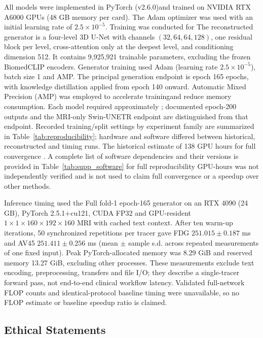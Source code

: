 \documentclass{article}
\providecommand{\DIFaddtex}[1]{{\protect\color{blue} \sf #1}} %
\providecommand{\DIFdeltex}[1]{{\protect\color{red} \scriptsize #1}} %
\providecommand{\DIFaddbegin}{} %
\providecommand{\DIFaddend}{} %
\providecommand{\DIFdelbegin}{} %
\providecommand{\DIFdelend}{} %
\providecommand{\DIFadd}[1]{\texorpdfstring{\DIFaddtex{#1}}{#1}} %
\providecommand{\DIFdel}[1]{\texorpdfstring{\DIFdeltex{#1}}{}} %
\newcommand{\DIFscaledelfig}{0.5}
\newlength{\DIFdelgraphicswidth} %
\newlength{\DIFdelgraphicsheight} %
\newcommand{\DIFaddincludegraphics}[2][]{{\color{blue}\fbox{\DIFOincludegraphics[#1]{#2}}}} %
\newcommand{\DIFdelincludegraphics}[2][]{%
\sbox{\DIFdelgraphicsbox}{\DIFOincludegraphics[#1]{#2}}%
\settoboxwidth{\DIFdelgraphicswidth}{\DIFdelgraphicsbox} %
\settoboxtotalheight{\DIFdelgraphicsheight}{\DIFdelgraphicsbox} %
\scalebox{\DIFscaledelfig}{%
\parbox[b]{\DIFdelgraphicswidth}{\usebox{\DIFdelgraphicsbox}\\[-\baselineskip] \rule{\DIFdelgraphicswidth}{0em}}\llap{\resizebox{\DIFdelgraphicswidth}{\DIFdelgraphicsheight}{%
\setlength{\unitlength}{\DIFdelgraphicswidth}%
\begin{picture}(1,1)%
\thicklines\linethickness{2pt} %
{\color[rgb]{1,0,0}\put(0,0){\framebox(1,1){}}}%
{\color[rgb]{1,0,0}\put(0,0){\line( 1,1){1}}}%
{\color[rgb]{1,0,0}\put(0,1){\line(1,-1){1}}}%
\end{picture}%
}\hspace*{3pt}}} %
} %
\DeclareRobustCommand{\DIFaddbegin}{\DIFOaddbegin \let\includegraphics\DIFaddincludegraphics} %
\DeclareRobustCommand{\DIFaddend}{\DIFOaddend \let\includegraphics\DIFOincludegraphics} %
\DeclareRobustCommand{\DIFdelbegin}{\DIFOdelbegin \let\includegraphics\DIFdelincludegraphics} %
\DeclareRobustCommand{\DIFdelend}{\DIFOaddend \let\includegraphics\DIFOincludegraphics} %
\begin{document}
\DIFdelbegin \DIFdel{All models were implemented in PyTorch (v2.6.0)and trained on NVIDIA RTX A6000 GPUs (48 GB memory per card). The Adam optimizer was used with an initial learning rate of $2.5 \times 10^{-5}$. Training was conducted for }\DIFdelend \DIFaddbegin \DIFadd{The reconstructed generator is a four-level 3D U-Net with channels $(32,64,64,128)$, one residual block per level, cross-attention only at the deepest level, and conditioning dimension 512. It contains 9,925,921 trainable parameters, excluding the frozen BiomedCLIP encoders. Generator training used Adam (learning rate $2.5\times10^{-5}$), batch size 1 and AMP. The principal generation endpoint is epoch }\DIFaddend 165\DIFdelbegin \DIFdel{epochs, with knowledge distillation applied from epoch 140 onward. Automatic Mixed Precision (AMP) was employed to accelerate trainingand reduce memory consumption. Each model required approximately }\DIFdelend \DIFaddbegin \DIFadd{; documented epoch-200 outputs and the MRI-only Swin-UNETR endpoint are distinguished from that endpoint. Recorded training/split settings by experiment family are summarized in Table~\ref{tab:reproducibility}; hardware and software differed between historical, reconstructed and timing runs. The historical estimate of }\DIFaddend 138 \DIFdelbegin \DIFdel{GPU hours for full convergence . A complete list of software dependencies and their versions is provided in Table~\ref{tab:supp_software} for full reproducibility}\DIFdelend \DIFaddbegin \DIFadd{GPU-hours was not independently verified and is not used to claim full convergence or a speedup over other methods.
}

\DIFadd{Inference timing used the Full fold-1 epoch-165 generator on an RTX 4090 (24 GB), PyTorch 2.5.1+cu121, CUDA FP32 and GPU-resident $1\times1\times160\times192\times160$ MRI with cached text context. After ten warm-up iterations, 50 synchronized repetitions per tracer gave FDG $251.015\pm0.187$ ms and AV45 $251.411\pm0.256$ ms (mean $\pm$ sample s.d. across repeated measurements of one fixed input). Peak PyTorch-allocated memory was 8.29 GiB and reserved memory 13.27 GiB, excluding other processes. These measurements exclude text encoding, preprocessing, transfers and file I/O; they describe a single-tracer forward pass, not end-to-end clinical workflow latency. Validated full-network FLOP counts and identical-protocol baseline timing were unavailable, so no FLOP estimate or baseline speedup ratio is claimed}\DIFaddend .

\subsection{Ethical Statements}
\end{document}
